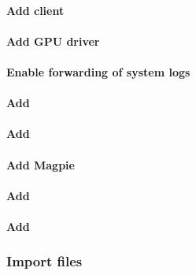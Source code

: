 \documentclass[letterpaper]{article}
\begin{document}
\paragraph{Add \Lustre{} client} \label{sec:lustre_client}




\paragraph{Add GPU driver}


\paragraph{Enable forwarding of system logs} \label{sec:add_syslog}


\paragraph{Add \clustershell{}}


\paragraph{Add \genders{}}


\paragraph{Add Magpie}


\paragraph{Add \conman{}} \label{sec:add_conman}


\paragraph{Add \nhc{}} \label{sec:add_nhc}



\subsubsection{Import files} \label{sec:file_import}







\end{document}

